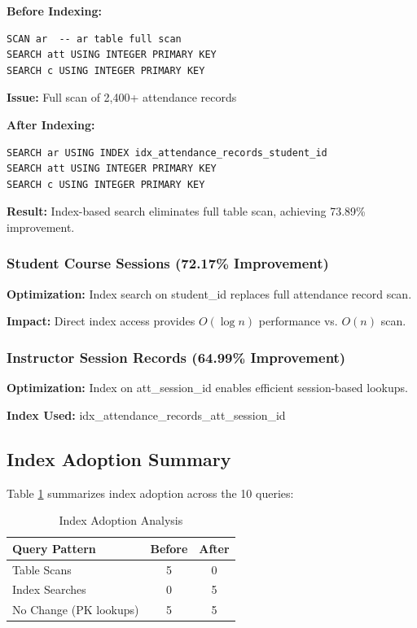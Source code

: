 \documentclass[conference]{IEEEtran}
\begin{document}
\textbf{Before Indexing:}
\begin{lstlisting}[caption=student\_my\_attendance Before]
SCAN ar  -- ar table full scan
SEARCH att USING INTEGER PRIMARY KEY
SEARCH c USING INTEGER PRIMARY KEY
\end{lstlisting}

\textbf{Issue:} Full scan of 2,400+ attendance records

\textbf{After Indexing:}
\begin{lstlisting}[caption=student\_my\_attendance After]
SEARCH ar USING INDEX idx_attendance_records_student_id
SEARCH att USING INTEGER PRIMARY KEY
SEARCH c USING INTEGER PRIMARY KEY
\end{lstlisting}

\textbf{Result:} Index-based search eliminates full table scan, achieving 73.89\% improvement.

\subsubsection{Student Course Sessions (72.17\% Improvement)}

\textbf{Optimization:} Index search on student\_id replaces full attendance record scan.

\textbf{Impact:} Direct index access provides $O(\log n)$ performance vs. $O(n)$ scan.

\subsubsection{Instructor Session Records (64.99\% Improvement)}

\textbf{Optimization:} Index on att\_session\_id enables efficient session-based lookups.

\textbf{Index Used:} idx\_attendance\_records\_att\_session\_id

\subsection{Index Adoption Summary}

Table \ref{tab:index_adoption} summarizes index adoption across the 10 queries:

\begin{table}[htbp]
\caption{Index Adoption Analysis}
\begin{center}
\begin{tabular}{|l|c|c|}
\hline
\textbf{Query Pattern} & \textbf{Before} & \textbf{After} \\
\hline
Table Scans & 5 & 0 \\
Index Searches & 0 & 5 \\
No Change (PK lookups) & 5 & 5 \\
\hline
\end{tabular}
\label{tab:index_adoption}
\end{center}
\end{table}
\end{document}
